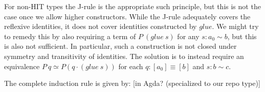 For non-HIT types the J-rule is the appropriate such principle, but this is not
the case once we allow higher constructors. While the J-rule
adequately covers the reflexive identities, it does not cover identities
constructed by $glue$. We might try to remedy this by also requiring a term of
$P~(glue~s)$ for any $s : a_0 \sim b$, but this is also not sufficient. In
particular, such a construction is not closed under symmetry and transitivity of
identities.
The solution is to instead require an equivalence $P~q \simeq P (q \cdot
(glue~s))$ for each $q : [a_0] \equiv [ b ]$ and $s : b \sim c$.

The complete induction rule is given by:
[in Agda? (specialized to our repo type)]
\begin{code}[hide]%
%
\>[2]\<%
\\
\>[2][@{}l@{\AgdaIndent{0}}]%
\>[4]\AgdaSpace{}%
\AgdaSymbol{:}\<%
\\
\>[4][@{}l@{\AgdaIndent{0}}]%
\>[6]\AgdaSymbol{\{}\AgdaSpace{}%
\AgdaSymbol{:}\AgdaSpace{}%
\AgdaSymbol{\}}\<%
\\
%
\>[6]\AgdaSymbol{\{}\AgdaSpace{}%
\AgdaSymbol{:}\AgdaSpace{}%
\AgdaSymbol{\}}\<%
\\
%
\>[6]\AgdaSymbol{(}\AgdaSpace{}%
\AgdaSymbol{:}\AgdaSpace{}%
\AgdaSymbol{\{}\AgdaSpace{}%
\AgdaSymbol{:}\AgdaSpace{}%
\AgdaSymbol{\}}\AgdaSpace{}%
\AgdaSpace{}%
\AgdaOperator{\AgdaInductiveConstructor{[}}\AgdaSpace{}%
\AgdaSpace{}%
\AgdaOperator{\AgdaInductiveConstructor{]}}\AgdaSpace{}%
\AgdaSpace{}%
\AgdaOperator{\AgdaInductiveConstructor{[}}\AgdaSpace{}%
\AgdaSpace{}%
\AgdaOperator{\AgdaInductiveConstructor{]}}\AgdaSpace{}%
\AgdaSpace{}%
\AgdaSpace{}%
\AgdaSymbol{)}\<%
\\
%
\>[6]\AgdaSpace{}%
\AgdaSpace{}%
\<%
\\
%
\>[6]\AgdaSpace{}%
\AgdaSymbol{(\{}\AgdaSpace{}%
\AgdaSymbol{:}\AgdaSpace{}%
\AgdaSymbol{\}}\AgdaSpace{}%
\AgdaSpace{}%
\AgdaSymbol{(}\AgdaSpace{}%
\AgdaSymbol{:}\AgdaSpace{}%
\AgdaOperator{\AgdaInductiveConstructor{[}}\AgdaSpace{}%
\AgdaSpace{}%
\AgdaOperator{\AgdaInductiveConstructor{]}}\AgdaSpace{}%
\AgdaSpace{}%
\AgdaOperator{\AgdaInductiveConstructor{[}}\AgdaSpace{}%

\end{code}
